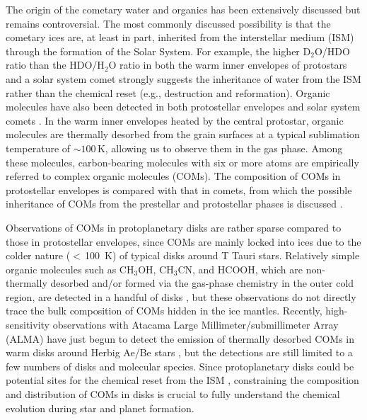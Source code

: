 \documentclass[linenumbers, twocolumn, twocolappendix, astrosymb, times]{aastex631}
\newcommand{\methanol}{CH$_3$OH\xspace}
\begin{document}
The origin of the cometary water and organics has been extensively discussed but remains controversial. The most commonly discussed possibility is that the cometary ices are, at least in part, inherited from the interstellar medium (ISM) through the formation of the Solar System. 
For example, the higher D$_2$O/HDO ratio than the HDO/H$_2$O ratio in both the warm inner envelopes of protostars \citep{Coutens2014, Jensen2021} and a solar system comet \citep{Altwegg2017}
strongly suggests the inheritance of water from the ISM rather than the chemical reset (e.g., destruction and reformation).
Organic molecules have also been detected in both protostellar envelopes and solar system comets \citep[e.g.,][]{Jorgensen2016, Rubin2019}. In the warm inner envelopes heated by the central protostar, organic molecules are thermally desorbed from the grain surfaces at a typical sublimation temperature of $\sim100$\,K, allowing us to observe them in the gas phase. Among these molecules, carbon-bearing molecules with six or more atoms are empirically referred to complex organic molecules (COMs). The composition of COMs in protostellar envelopes is compared with that in comets, from which the possible inheritance of COMs from the prestellar and protostellar phases is discussed \citep[e.g.,][]{Drozdovskaya2019}.

Observations of COMs in protoplanetary disks are rather sparse compared to those in protostellar envelopes, since COMs are mainly locked into ices due to the colder nature ($<$\,100~K) of typical disks around T Tauri stars.  Relatively simple organic molecules such as \methanol, CH$_3$CN, and HCOOH, which are non-thermally desorbed and/or formed via the gas-phase chemistry in the outer cold region, are detected in a handful of disks \citep{Walsh2016, Oberg2015, Bergner2018, Loomis2018, Ilee2021, Favre2018}, but these observations do not directly trace the bulk composition of COMs hidden in the ice mantles. Recently, high-sensitivity observations with Atacama Large Millimeter/submillimeter Array (ALMA) have just begun to detect the emission of thermally desorbed COMs in warm disks around Herbig Ae/Be stars \citep{vanderMarel2021, Booth2021_CH3OH, Brunken2022, Booth2023_HD169142}, but the detections are still limited to a few numbers of disks and molecular species. Since protoplanetary disks could be potential sites for the chemical reset from the ISM \citep[e.g.,][]{Walsh2014, Furuya2014, Eistrup2016}, constraining the composition and distribution of COMs in disks is crucial to fully understand the chemical evolution during star and planet formation.
\end{document}
